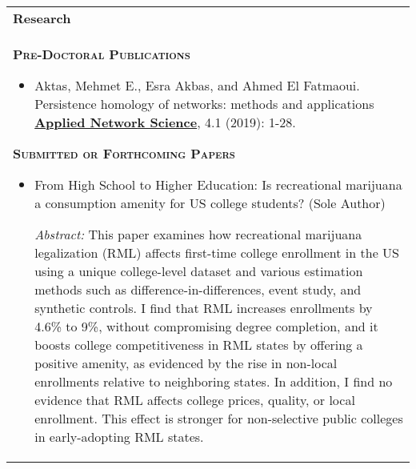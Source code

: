 \documentclass[10pt,letterpaper]{article}
\begin{document}
\begin{tabular}{p{7.5in}} \\
{\textbf{\large{Research}}} \\[1.5ex]


 \textsc{\textbf{Pre-Doctoral Publications}} 

\begin{itemize}
\item Aktas,  Mehmet E., Esra Akbas, and Ahmed El Fatmaoui.  Persistence homology of networks: methods and applications \href{https://appliednetsci.springeropen.com/articles/10.1007/s41109-019-0179-3}{\textbf{Applied Network Science}},  4.1 (2019): 1-28.
\end{itemize}

\textsc{\textbf{Submitted or Forthcoming Papers}}

\begin{itemize}
\item From High School to Higher Education: Is recreational marijuana a consumption amenity  for US college students? (Sole Author)

\textit{Abstract: } This paper examines how recreational marijuana legalization (RML) affects first-time college enrollment in the US using a unique college-level dataset and various estimation methods such as difference-in-differences, event study, and synthetic controls. I find that RML increases enrollments by 4.6\% to 9\%, without compromising degree completion, and it boosts college competitiveness in RML states by offering a positive amenity, as evidenced by the rise in non-local enrollments relative to neighboring states. In addition, I find no evidence that RML affects college prices, quality, or local enrollment. This effect is stronger for non-selective public colleges in early-adopting RML states.


\end{itemize}
\end{tabular}
\end{document}
